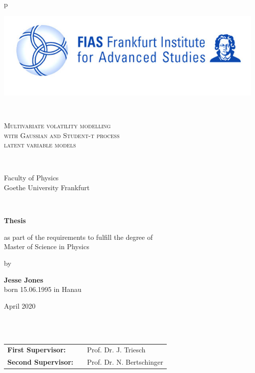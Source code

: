 \begin{center}
\begin{tabular}{p{\textwidth}}
\begin{center}
\includegraphics[scale=0.5]{img/01_0/fias.jpg}
\end{center}
\\
\begin{center}
\LARGE{\textsc{
 Multivariate volatility modelling \\ 
 with Gaussian and Student-t process \\
 latent variable models \\
}}
\end{center} \\
\begin{center}
\large{Faculty of Physics \\
Goethe University Frankfurt \\}
\end{center} \\
\begin{center}
\textbf{\Large{Thesis}}
\end{center}

\begin{center}
as part of the requirements to fulfill the degree of\\
Master of Science in Physics
\end{center}

\begin{center}
by
\end{center}

\begin{center}
\large{\textbf{Jesse Jones}} \\
\small{born 15.06.1995 in Hanau}
\end{center}

\begin{center}
\large{April 2020}
\end{center} \\ \\
\begin{center}
\begin{tabular}{lll}
\textbf{First Supervisor:} & & Prof. Dr. J. Triesch\\
\textbf{Second Supervisor:} & &Prof. Dr. N. Bertschinger\\
\end{tabular}
\end{center}
\end{tabular}
\end{center}
